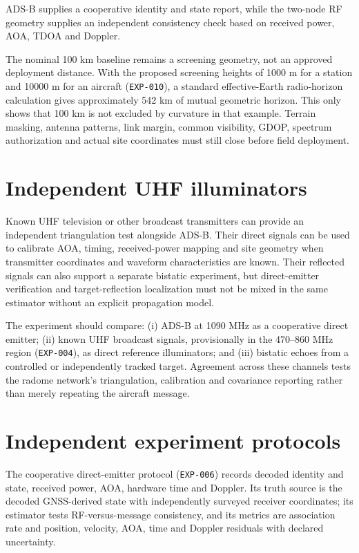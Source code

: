 ADS-B supplies a cooperative identity and state report, while the two-node RF geometry supplies an independent consistency check based on received power, AOA, TDOA and Doppler.

The nominal 100 km baseline remains a screening geometry, not an approved deployment distance. With the proposed screening heights of 1000 m for a station and 10000 m for an aircraft (\texttt{EXP-010}), a standard effective-Earth radio-horizon calculation gives approximately 542 km of mutual geometric horizon. This only shows that 100 km is not excluded by curvature in that example. Terrain masking, antenna patterns, link margin, common visibility, GDOP, spectrum authorization and actual site coordinates must still close before field deployment.

\section{Independent UHF illuminators}
Known UHF television or other broadcast transmitters can provide an independent triangulation test alongside ADS-B. Their direct signals can be used to calibrate AOA, timing, received-power mapping and site geometry when transmitter coordinates and waveform characteristics are known. Their reflected signals can also support a separate bistatic experiment, but direct-emitter verification and target-reflection localization must not be mixed in the same estimator without an explicit propagation model.

The experiment should compare: (i) ADS-B at 1090 MHz as a cooperative direct emitter; (ii) known UHF broadcast signals, provisionally in the 470--860 MHz region (\texttt{EXP-004}), as direct reference illuminators; and (iii) bistatic echoes from a controlled or independently tracked target. Agreement across these channels tests the radome network's triangulation, calibration and covariance reporting rather than merely repeating the aircraft message.

\section{Independent experiment protocols}
The cooperative direct-emitter protocol (\texttt{EXP-006}) records decoded identity and state, received power, AOA, hardware time and Doppler. Its truth source is the decoded GNSS-derived state with independently surveyed receiver coordinates; its estimator tests RF-versus-message consistency, and its metrics are association rate and position, velocity, AOA, time and Doppler residuals with declared uncertainty.


